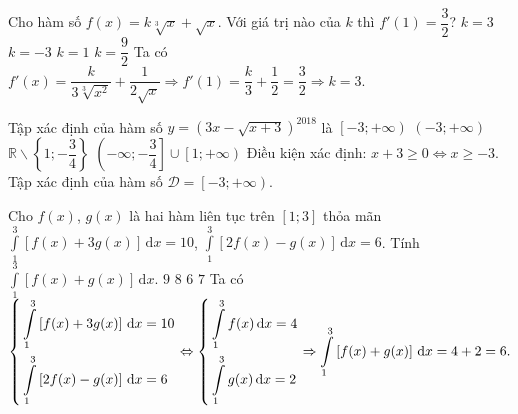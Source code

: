 \begin{ex}%
	Cho hàm số $f(x)=k\sqrt[3]{x}+\sqrt{x}$. Với giá trị nào của $k$ thì $f'(1)=\dfrac{3}{2}$?
	\choice
	{\True $k=3$}
	{$k=-3$}
	{$k=1$}
	{$k=\dfrac{9}{2}$}
	\loigiai
	{
		Ta có $f'(x)=\dfrac{k}{3\sqrt[3]{x^2}}+\dfrac{1}{2\sqrt{x}}\Rightarrow f'(1)=\dfrac{k}{3}+\dfrac{1}{2}=\dfrac{3}{2}\Rightarrow k=3$.
	}
\end{ex} 

\begin{ex}%
	Tập xác định của hàm số $y=\left(3x-\sqrt{x+3}\right)^{2018}$ là
	\choice
	{\True $\left[-3;+\infty\right)$}
	{$\left(-3;+\infty\right)$}
	{$\mathbb{R}\backslash\left\{1;-\dfrac{3}{4}\right\}$}
	{$\left(-\infty;-\dfrac{3}{4}\right]\cup \left[1;+\infty\right)$}
	\loigiai
	{
		Điều kiện xác định: $x+3\ge 0\Leftrightarrow x\ge -3$.\\
		Tập xác định của hàm số $\mathscr{D}=\left[-3;+\infty\right)$.
	}
\end{ex} 

\begin{ex}%
	Cho $f(x)$, $g(x)$ là hai hàm liên tục trên $\left[1;3\right]$ thỏa mãn $\displaystyle\int\limits_1^3 \left[f(x)+3g(x)\right] \mathrm{\,d}x=10$, $\displaystyle\int\limits_1^3 \left[2f(x)-g(x)\right] \mathrm{\,d}x=6$. Tính $\displaystyle\int\limits_1^3 \left[f(x)+g(x)\right] \mathrm{\,d}x$.
	\choice
	{$9$}
	{$8$}
	{\True $6$}
	{$7$}
	\loigiai
	{
		Ta có $\left\{\begin{aligned}&\displaystyle\int\limits_1^3 \left[f(x)+3g(x)\right] \mathrm{\,d}x=10\\&\displaystyle\int\limits_1^3 \left[2f(x)-g(x)\right] \mathrm{\,d}x=6\end{aligned}\right.\Leftrightarrow \left\{\begin{aligned}&\displaystyle\int\limits_1^3 f(x) \mathrm{\,d}x=4\\&\displaystyle\int\limits_1^3 g(x) \mathrm{\,d}x=2\end{aligned}\right.\Rightarrow \displaystyle\int\limits_1^3 \left[f(x)+g(x)\right] \mathrm{\,d}x=4+2=6.$
	}
\end{ex} 

